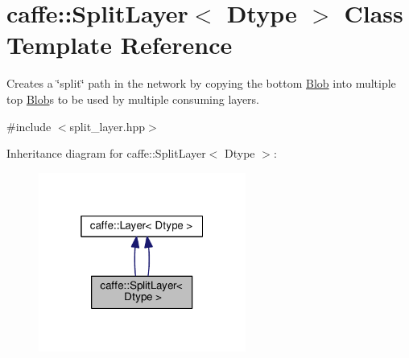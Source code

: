 \hypertarget{classcaffe_1_1_split_layer}{}\section{caffe\+:\+:Split\+Layer$<$ Dtype $>$ Class Template Reference}
\label{classcaffe_1_1_split_layer}


Creates a \char`\"{}split\char`\"{} path in the network by copying the bottom \mbox{\hyperlink{classcaffe_1_1_blob}{Blob}} into multiple top \mbox{\hyperlink{classcaffe_1_1_blob}{Blob}}s to be used by multiple consuming layers.  




{\ttfamily \#include $<$split\+\_\+layer.\+hpp$>$}



Inheritance diagram for caffe\+:\+:Split\+Layer$<$ Dtype $>$\+:
\nopagebreak
\begin{figure}[H]
\begin{center}
\leavevmode
\includegraphics[width=193pt]{classcaffe_1_1_split_layer__inherit__graph}
\end{center}
\end{figure}
